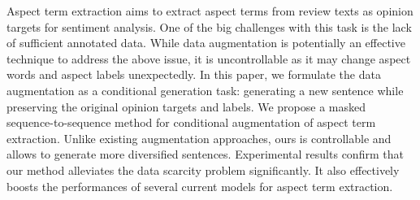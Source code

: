 Aspect term extraction aims to extract aspect terms from review texts as opinion targets for sentiment analysis. One of the big challenges with this task is the lack of sufficient annotated data. While data augmentation is potentially an effective technique to address the above issue, it is uncontrollable as it may change aspect words and aspect labels unexpectedly. In this paper, we formulate the data augmentation as a conditional generation task: generating a new sentence while preserving the original opinion targets and labels. We propose a masked sequence-to-sequence method for conditional augmentation of aspect term extraction. Unlike existing augmentation approaches, ours is controllable and allows to generate more diversified sentences. Experimental results confirm that our method alleviates the data scarcity problem significantly. It also effectively boosts the performances of several current models for aspect term extraction.
